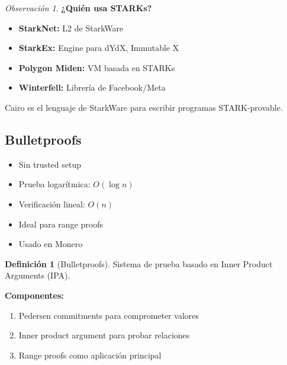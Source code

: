 \documentclass[11pt,a4paper,twoside,openright]{book}
\theoremstyle{definition}
\newtheorem{definition}{Definición}[chapter]
\theoremstyle{plain}
\theoremstyle{remark}
\newtheorem{remark}{Observación}[chapter]
\begin{document}
\begin{remark}
\textbf{¿Quién usa STARKs?}

\begin{itemize}
    \item \textbf{StarkNet:} L2 de StarkWare
    \item \textbf{StarkEx:} Engine para dYdX, Immutable X
    \item \textbf{Polygon Miden:} VM basada en STARKs
    \item \textbf{Winterfell:} Librería de Facebook/Meta
\end{itemize}

Cairo es el lenguaje de StarkWare para escribir programas STARK-provable.
\end{remark}

\subsection{Bulletproofs}

\begin{itemize}
    \item Sin trusted setup
    \item Prueba logarítmica: $O(\log n)$
    \item Verificación lineal: $O(n)$
    \item Ideal para range proofs
    \item Usado en Monero
\end{itemize}

\begin{definition}[Bulletproofs]
Sistema de prueba basado en Inner Product Arguments (IPA).

\textbf{Componentes:}
\begin{enumerate}
    \item Pedersen commitments para comprometer valores
    \item Inner product argument para probar relaciones
    \item Range proofs como aplicación principal
\end{enumerate}
\end{definition}
\end{document}
